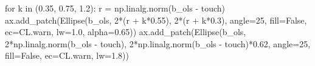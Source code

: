 \documentclass[
  letterpaper,
  10pt,
  twoside,
  openright,
  numbers=noenddot,
  chapterprefix=true]{scrbook}
\newenvironment{Shaded}{}{}
\newcommand{\ControlFlowTok}[1]{\textcolor[rgb]{0.84,0.23,0.29}{#1}}
\newcommand{\DecValTok}[1]{\textcolor[rgb]{0.00,0.36,0.77}{#1}}
\newcommand{\FloatTok}[1]{\textcolor[rgb]{0.00,0.36,0.77}{#1}}
\newcommand{\KeywordTok}[1]{\textcolor[rgb]{0.84,0.23,0.29}{#1}}
\newcommand{\NormalTok}[1]{\textcolor[rgb]{0.14,0.16,0.18}{#1}}
\newcommand{\OperatorTok}[1]{\textcolor[rgb]{0.14,0.16,0.18}{#1}}
\newcommand{\VariableTok}[1]{\textcolor[rgb]{0.89,0.38,0.04}{#1}}
\begin{document}
\begin{Shaded}
\begin{Highlighting}[]
    \ControlFlowTok{for}\NormalTok{ k }\KeywordTok{in}\NormalTok{ (}\FloatTok{0.35}\NormalTok{, }\FloatTok{0.75}\NormalTok{, }\FloatTok{1.2}\NormalTok{):}
\NormalTok{        r }\OperatorTok{=}\NormalTok{ np.linalg.norm(b\_ols }\OperatorTok{{-}}\NormalTok{ touch)}
\NormalTok{        ax.add\_patch(Ellipse(b\_ols, }\DecValTok{2}\OperatorTok{*}\NormalTok{(r }\OperatorTok{+}\NormalTok{ k}\OperatorTok{*}\FloatTok{0.55}\NormalTok{), }\DecValTok{2}\OperatorTok{*}\NormalTok{(r }\OperatorTok{+}\NormalTok{ k}\OperatorTok{*}\FloatTok{0.3}\NormalTok{), angle}\OperatorTok{=}\DecValTok{25}\NormalTok{,}
\NormalTok{                             fill}\OperatorTok{=}\VariableTok{False}\NormalTok{, ec}\OperatorTok{=}\NormalTok{CL.warn, lw}\OperatorTok{=}\FloatTok{1.0}\NormalTok{, alpha}\OperatorTok{=}\FloatTok{0.65}\NormalTok{))}
\NormalTok{    ax.add\_patch(Ellipse(b\_ols, }\DecValTok{2}\OperatorTok{*}\NormalTok{np.linalg.norm(b\_ols }\OperatorTok{{-}}\NormalTok{ touch),}
                         \DecValTok{2}\OperatorTok{*}\NormalTok{np.linalg.norm(b\_ols }\OperatorTok{{-}}\NormalTok{ touch)}\OperatorTok{*}\FloatTok{0.62}\NormalTok{, angle}\OperatorTok{=}\DecValTok{25}\NormalTok{,}
\NormalTok{                         fill}\OperatorTok{=}\VariableTok{False}\NormalTok{, ec}\OperatorTok{=}\NormalTok{CL.warn, lw}\OperatorTok{=}\FloatTok{1.8}\NormalTok{))}


\end{Highlighting}
\end{Shaded}
\end{document}

